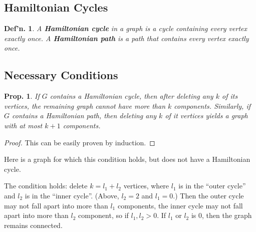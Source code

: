 \documentclass[12pt, a4paper]{book}
\newtheorem{definition}[theorem]{Def'n.}
\newtheorem{proposition}[theorem]{Prop.}
\theoremstyle{nonumberplain}
\newtheorem{proof}{Proof}
\begin{document}
\subsection{Hamiltonian Cycles}
\begin{definition}
    A \textbf{Hamiltonian cycle} in a graph is a cycle containing every vertex exactly once.
    A \textbf{Hamiltonian path} is a path that contains every vertex exactly once.
\end{definition}
\subsection{Necessary Conditions}
\begin{proposition}
    If $G$ contains a Hamiltonian cycle, then after deleting any $k$ of its vertices, the remaining graph cannot have more than $k$ components.
    Similarly, if $G$ contains a Hamiltonian path, then deleting any $k$ of it vertices yields a graph with at most $k+1$ components.
\end{proposition}
\begin{proof}
    This can be easily proven by induction.
\end{proof}
Here is a graph for which this condition holds, but does not have a Hamiltonian cycle.
\begin{center}
\end{center}
The condition holds: delete $k=l_1+l_2$ vertices, where $l_1$ is in the ``outer cycle'' and $l_2$ is in the ``inner cycle''.
(Above, $l_2=2$ and $l_1=0$.)
Then the outer cycle may not fall apart into more than $l_1$ components, the inner cycle may not fall apart into more than $l_2$ component, so if $l_1,l_2>0$.
If $l_1$ or $l_2$ is $0$, then the graph remains connected.
\end{document}
